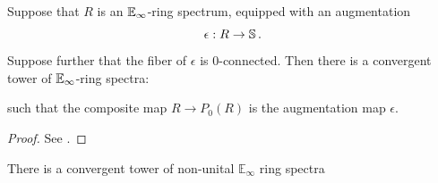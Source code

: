 \begin{lem} \label{lem:Kuhn}
Suppose that $R$ is an $\operatorname{\mathbb{E}}_\infty$-ring spectrum, equipped with an augmentation
$$\epsilon:R \to \operatorname{\mathbb{S}}.$$
Suppose further that the fiber of $\epsilon$ is $0$-connected.  Then there is a convergent tower of $\operatorname{\mathbb{E}}_{\infty}$-ring spectra:
\begin{center}
\end{center}
such that the composite map $R \to P_0(R)$ is the augmentation map $\epsilon$.
\end{lem}

\begin{proof}
See \cite[Theorem 3.10]{KuhnTAQ}.
\end{proof}

\begin{cor} \label{cor:goodwillie}
There is a convergent tower of non-unital $\mathbb{E}_\infty$ ring spectra
\begin{center}
\end{center}
\end{cor}

